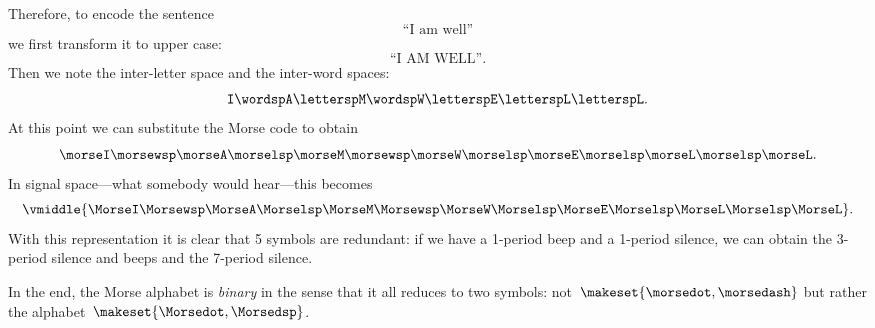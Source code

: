 \begin{example}
    Therefore, to encode the sentence
    \begin{equation}
        \text{``I am well''}
    \end{equation}
    we first transform it to upper case:
    \begin{equation}
        \text{``I AM WELL''}.
    \end{equation}
    Then we note the inter-letter space and the inter-word spaces:
    \begin{equation}
        \texttt{I} \wordsp \texttt{A} \lettersp \texttt{M} \wordsp \texttt{W} \lettersp
        \texttt{E} \lettersp \texttt{L} \lettersp \texttt{L}.
    \end{equation}
    At this point we can substitute the Morse code to obtain
    \begin{equation}
        \morseI \morsewsp \morseA \morselsp \morseM \morsewsp \morseW \morselsp \morseE \morselsp \morseL \morselsp \morseL.
    \end{equation}
    In signal space---what somebody would hear---this becomes
    \begin{equation}
        \vmiddle{\MorseI \Morsewsp \MorseA \Morselsp \MorseM \Morsewsp \MorseW \Morselsp \MorseE \Morselsp \MorseL \Morselsp \MorseL}.
    \end{equation}
    With this representation it is clear that 5 symbols are redundant: if we have a 1-period beep and a 1-period silence, we can obtain the 3-period silence and beeps and the 7-period silence.

    In the end, the Morse alphabet is \emph{binary} in the sense that it all reduces to two symbols: not~$\makeset{\morsedot, \morsedash}$ but rather the alphabet~$\makeset{\Morsedot, \Morsedsp}$.
\end{example}

